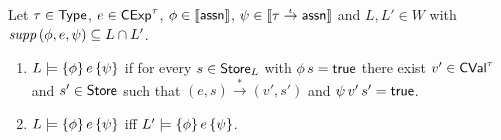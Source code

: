 \documentclass[12pt,a4paper]{report}
\newcommand{\CExp}{\sstyle{CExp}}
\newcommand{\CVal}{\sstyle{CVal}}
\begin{document}
\begin{lemma}
  Let $\tau\in\mathsf{Type}$, $e\in\CExp^\tau$, $\phi\in\llbracket\mathsf{assn}\rrbracket$, $\psi\in\llbracket\tau\stackrel{_t}{\to}\mathsf{assn}\rrbracket$
  and $L,L'\in W$ with $\mathit{supp}\,(\phi,e,\psi) \subseteq L \cap L'$.
  \begin{enumerate}
    \item $L\models\{\phi\}\,e\,\{\psi\}$ if for every $s \in \mathsf{Store}_L$ with $\phi\,s=\mathsf{true}$ there exist $v'\in\CVal^\tau$ and 
          $s'\in\mathsf{Store}$ such that $(e,s) \xrightarrow* (v',s')$ and $\psi\,v'\,s'=\mathsf{true}$.

    \item $L\models\{\phi\}\,e\,\{\psi\}$ iff $L'\models\{\phi\}\,e\,\{\psi\}$.
  \end{enumerate}
\end{lemma}
\end{document}
